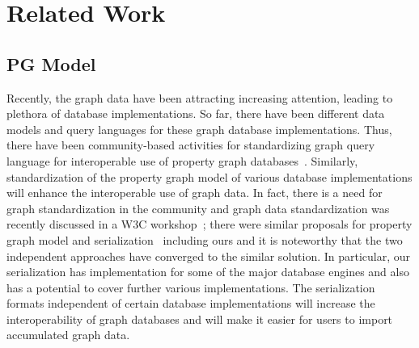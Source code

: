 \documentclass[runningheads]{llncs}
\begin{document}

\section{Related Work}

\subsection{PG Model}
Recently, the graph data have been attracting increasing attention, leading to plethora of database implementations. 
So far, there have been different data models and query languages for these graph database implementations.
Thus, there have been community-based activities for standardizing graph query language for interoperable use of property graph databases~\cite{angles3}. Similarly, standardization of the property graph model of various database implementations will enhance the interoperable use of graph data. In fact, there is a need for graph standardization in the community and graph data standardization was recently discussed in a W3C workshop~\cite{w3c}; there were similar proposals for property graph model and serialization~\cite{tomaszuk} including ours and it is noteworthy that the two independent approaches have converged to the similar solution. 
In particular, our serialization has implementation for some of the major database engines and also has a potential to cover further various implementations. %
The serialization formats independent of certain database implementations will increase the interoperability of graph databases and will make it easier for users to import accumulated graph data.
\end{document}
